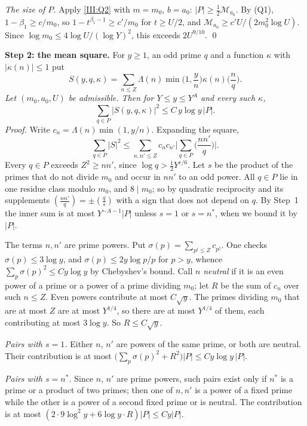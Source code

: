 \documentclass[11pt,letterpaper]{article}
\begin{document}
\emph{The size of $P$.} Apply \eqref{III:Q2} with $m=m_0$, $b=a_0$: $|P|\ge\frac12\mathcal M_{a_0}$. By (Q1),
$1-\beta_1\ge c/m_0$, so $1-t^{\beta_1-1}\ge c'/m_0$ for $t\ge U/2$, and
$\mathcal M_{a_0}\ge c'U/(2m_0^2\log U)$. Since $\log m_0\le4\log U/(\log Y)^2$, this exceeds $2U^{9/10}$. \qed

\textbf{Step 2: the mean square.} For $y\ge1$, an odd prime $q$ and a function $\kappa$ with $|\kappa(n)|\le1$ put
\begin{equation}\label{D:121}
 S(y,q,\kappa)=\sum_{n\le Z}\Lambda(n)\min\Big(1,\frac yn\Big)\kappa(n)\Big(\frac nq\Big).
\end{equation}
\emph{Let $(m_0,a_0,U)$ be admissible. Then for $Y\le y\le Y^A$ and every such $\kappa$,}
\begin{equation}\label{III:ms}
 \sum_{q\in P}|S(y,q,\kappa)|^2\le C\,y\log y\,|P| .
\end{equation}
\emph{Proof.} Write $c_n=\Lambda(n)\min(1,y/n)$. Expanding the square,
\begin{equation}\label{D:123}
 \sum_{q\in P}|S|^2\le\sum_{n,n'\le Z}c_nc_{n'}\Big|\sum_{q\in P}\Big(\frac{nn'}q\Big)\Big| .
\end{equation}
Every $q\in P$ exceeds $Z^2\ge nn'$, since $\log q>\frac12Y^{\varepsilon/6}$. Let $s$ be the product of the
primes that do not divide $m_0$ and occur in $nn'$ to an odd power. All $q\in P$ lie in one residue class
modulo $m_0$, and $8\mid m_0$; so by quadratic reciprocity and its supplements $(\frac{nn'}q)=\pm(\frac qs)$
with a sign that does not depend on $q$. By Step~1 the inner sum is at most $Y^{-A-1}|P|$ unless $s=1$ or
$s=n^*$, when we bound it by $|P|$.

The terms $n,n'$ are prime powers. Put $\sigma(p)=\sum_{p^j\le Z}c_{p^j}$. One checks $\sigma(p)\le3\log y$,
and $\sigma(p)\le2y\log p/p$ for $p>y$, whence $\sum_p\sigma(p)^2\le Cy\log y$ by Chebyshev's bound. Call $n$
\emph{neutral} if it is an even power of a prime or a power of a prime dividing $m_0$; let
$R$ be the sum of $c_n$ over such $n\le Z$. Even powers contribute at most $C\sqrt y$. The primes dividing
$m_0$ that are at most $Z$ are at most $Y^{1/4}$, so there are at most $Y^{1/4}$ of them, each contributing
at most $3\log y$. So $R\le C\sqrt y$.

\emph{Pairs with $s=1$.} Either $n$, $n'$ are powers of the same prime, or both are neutral.
Their contribution is at most $\big(\sum_p\sigma(p)^2+R^2\big)|P|\le Cy\log y\,|P|$.

\emph{Pairs with $s=n^*$.} Since $n$, $n'$ are prime powers, such pairs exist only if $n^*$ is a prime or a
product of two primes; then one of $n,n'$ is a power of
a fixed prime while the other is a power of a second fixed prime or is neutral. The
contribution is at most $(2\cdot9\log^2y+6\log y\cdot R)|P|\le Cy|P|$.
\end{document}

